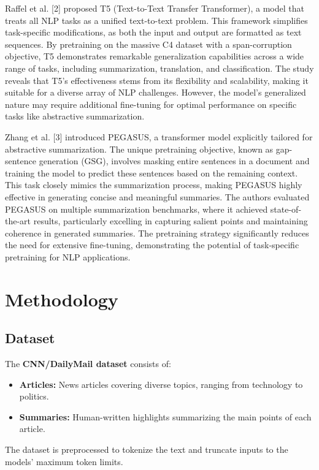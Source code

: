 \documentclass[a4paper,12pt]{article}
\begin{document}
Raffel et al. [2] proposed T5 (Text-to-Text Transfer Transformer), a model that treats all NLP tasks as a unified text-to-text problem. This framework simplifies task-specific modifications, as both the input and output are formatted as text sequences. By pretraining on the massive C4 dataset with a span-corruption objective, T5 demonstrates remarkable generalization capabilities across a wide range of tasks, including summarization, translation, and classification. The study reveals that T5's effectiveness stems from its flexibility and scalability, making it suitable for a diverse array of NLP challenges. However, the model's generalized nature may require additional fine-tuning for optimal performance on specific tasks like abstractive summarization.

Zhang et al. [3] introduced PEGASUS, a transformer model explicitly tailored for abstractive summarization. The unique pretraining objective, known as gap-sentence generation (GSG), involves masking entire sentences in a document and training the model to predict these sentences based on the remaining context. This task closely mimics the summarization process, making PEGASUS highly effective in generating concise and meaningful summaries. The authors evaluated PEGASUS on multiple summarization benchmarks, where it achieved state-of-the-art results, particularly excelling in capturing salient points and maintaining coherence in generated summaries. The pretraining strategy significantly reduces the need for extensive fine-tuning, demonstrating the potential of task-specific pretraining for NLP applications.
\section{Methodology}
\subsection{Dataset}
The \textbf{CNN/DailyMail dataset} consists of:
\begin{itemize}
    \item \textbf{Articles:} News articles covering diverse topics, ranging from technology to politics.
    \item \textbf{Summaries:} Human-written highlights summarizing the main points of each article.
\end{itemize}
The dataset is preprocessed to tokenize the text and truncate inputs to the models’ maximum token limits. 
\end{document}
